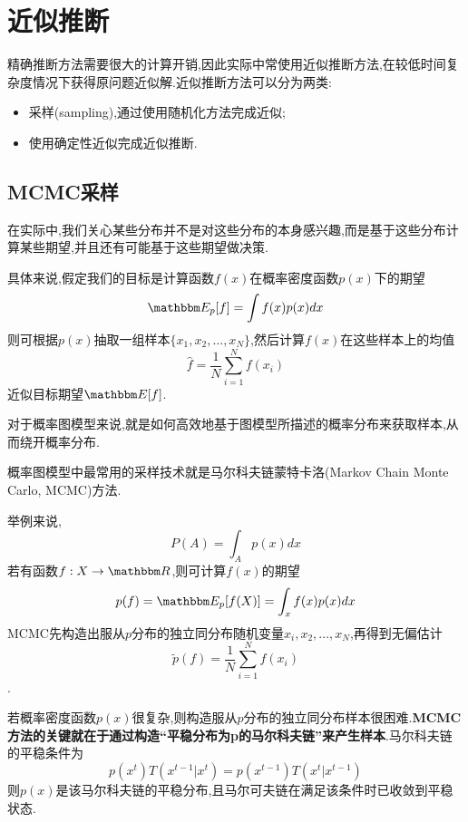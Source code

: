 \section{近似推断}

精确推断方法需要很大的计算开销,因此实际中常使用近似推断方法,在较低时间复杂度情况下获得原问题近似解.近似推断方法可以分为两类:
\begin{itemize}
\item 采样(sampling),通过使用随机化方法完成近似;
\item 使用确定性近似完成近似推断.
\end{itemize}

\subsection{MCMC采样}

在实际中,我们关心某些分布并不是对这些分布的本身感兴趣,而是基于这些分布计算某些期望,并且还有可能基于这些期望做决策.

具体来说,假定我们的目标是计算函数$f(x)$在概率密度函数$p(x)$下的期望
\begin{equation}
\mathbbm E_p[f]=\int f(x)p(x)dx
\end{equation}
则可根据$p(x)$抽取一组样本$\{x_1,x_2,\dots,x_N\}$,然后计算$f(x)$在这些样本上的均值
\begin{equation}
\hat f=\frac{1}{N}\sum_{i=1}^Nf(x_i)
\end{equation}
近似目标期望$\mathbbm E[f]$.

对于概率图模型来说,就是如何高效地基于图模型所描述的概率分布来获取样本,从而绕开概率分布.

概率图模型中最常用的采样技术就是马尔科夫链蒙特卡洛(Markov Chain Monte Carlo, MCMC)方法.

举例来说,
\begin{equation}
P(A)=\int_Ap(x)dx
\end{equation}
若有函数$f:X\rightarrow\mathbbm R$,则可计算$f(x)$的期望
\begin{equation}
p(f)=\mathbbm E_p[f(X)]=\int_xf(x)p(x)dx
\end{equation}
MCMC先构造出服从$p$分布的独立同分布随机变量$x_i,x_2,\dots,x_N$,再得到无偏估计
\begin{equation}
\tilde p(f)=\frac{1}{N}\sum_{i=1}^Nf(x_i)
\end{equation}
.

若概率密度函数$p(x)$很复杂,则构造服从$p$分布的独立同分布样本很困难.\textbf{MCMC方法的关键就在于通过构造``平稳分布为p的马尔科夫链''来产生样本}.马尔科夫链的平稳条件为
\begin{equation}
p(x^t)T(x^{t-1}|x^t)=p(x^{t-1})T(x^t|x^{t-1})
\end{equation}
则$p(x)$是该马尔科夫链的平稳分布,且马尔可夫链在满足该条件时已收敛到平稳状态.

